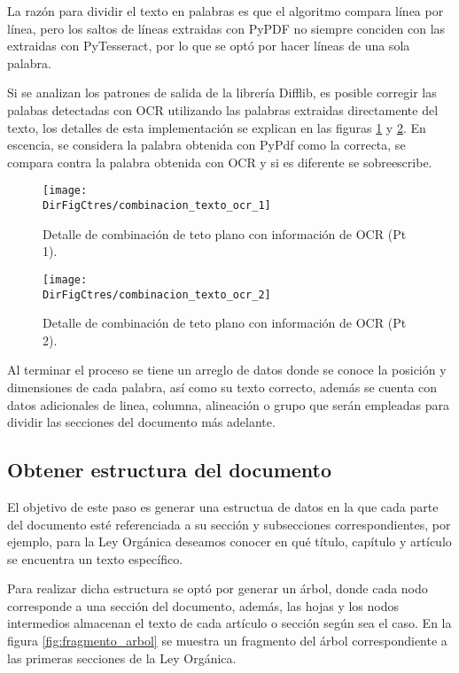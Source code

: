 La razón para dividir el texto en palabras es que el algoritmo compara línea por
línea, pero los saltos de líneas extraidas con PyPDF no siempre conciden con las
extraidas con PyTesseract, por lo que se optó por hacer líneas de una sola palabra.

Si se analizan los patrones de salida de la librería Difflib, es posible
corregir las palabas detectadas con OCR utilizando las palabras extraidas directamente
del texto, los detalles de esta implementación se explican en las figuras
\ref{fig:esquema_combinacion_txt_ocr_1} y \ref{fig:esquema_combinacion_txt_ocr_2}.
En escencia, se considera la palabra obtenida con PyPdf como la correcta,
se compara contra la palabra obtenida con OCR y si es diferente se sobreescribe.

\begin{figure}[]
    \centering
    \texttt{[image: \\DirFigCtres/combinacion\_texto\_ocr\_1]}
    \caption{Detalle de combinación de teto plano con información de OCR (Pt 1).}
    \label{fig:esquema_combinacion_txt_ocr_1}
\end{figure}

\begin{figure}[]
    \centering
    \texttt{[image: \\DirFigCtres/combinacion\_texto\_ocr\_2]}
    \caption{Detalle de combinación de teto plano con información de OCR (Pt 2).}
    \label{fig:esquema_combinacion_txt_ocr_2}
\end{figure}

Al terminar el proceso se tiene un arreglo de datos donde se conoce la posición
y dimensiones de cada palabra, así como su texto correcto, además se cuenta con
datos adicionales de linea, columna, alineación o grupo que serán empleadas
para dividir las secciones del documento más adelante.

\subsection{Obtener estructura del documento}

El objetivo de este paso es generar una estructua de datos en la que cada parte
del documento esté referenciada a su sección y subsecciones correspondientes,
por ejemplo, para la Ley Orgánica deseamos conocer en qué título, capítulo y
artículo se encuentra un texto específico.

Para realizar dicha estructura se optó por generar un árbol, donde cada nodo
corresponde a una sección del documento, además, las hojas y los nodos intermedios
almacenan el texto de cada artículo o sección según sea el caso. En la figura
\ref{fig:fragmento_arbol} se muestra un fragmento del árbol correspondiente a
las primeras secciones de la Ley Orgánica.

